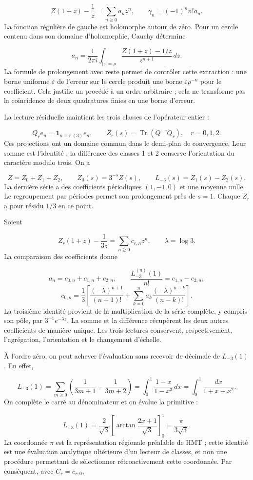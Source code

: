 \[
Z(1+z)-\frac1z=\sum_{n\geq0}a_nz^n,
\qquad \gamma_n=(-1)^nn!a_n.
\]
La fonction régulière de gauche est holomorphe autour de zéro. Pour un cercle contenu dans son domaine d’holomorphie, Cauchy détermine

\[
a_n=\frac1{2\pi i}\int_{|z|=\rho}
\frac{Z(1+z)-1/z}{z^{n+1}}\,dz.
\]
La formule de prolongement avec reste permet de contrôler cette extraction : une borne uniforme \(\varepsilon\) de l’erreur sur le cercle produit une borne \(\varepsilon\rho^{-n}\) pour le coefficient. Cela justifie un procédé à un ordre arbitraire ; cela ne transforme pas la coïncidence de deux quadratures finies en une borne d’erreur.

La lecture résiduelle maintient les trois classes de l'opérateur entier :

\[
Q_re_n=\mathbf1_{n\equiv r\ (3)}e_n,\qquad
Z_r(s)=\operatorname{Tr}(Q^{-s}Q_r),\quad r=0,1,2.
\]
Ces projections ont un domaine commun dans le demi-plan de convergence. Leur somme est l'identité ; la différence des classes 1 et 2 conserve l'orientation du caractère modulo trois. On a

\[
Z=Z_0+Z_1+Z_2,\qquad Z_0(s)=3^{-s}Z(s),\qquad
L_{-3}(s)=Z_1(s)-Z_2(s).
\]
La dernière série a des coefficients périodiques \((1,-1,0)\) et une moyenne nulle. Le regroupement par périodes permet son prolongement près de \(s=1\). Chaque \(Z_r\) a pour résidu \(1/3\) en ce point.

Soient

\[
Z_r(1+z)-\frac1{3z}=\sum_{n\geq0}c_{r,n}z^n,
\qquad \lambda=\log3.
\]
La comparaison des coefficients donne

\[
a_n=c_{0,n}+c_{1,n}+c_{2,n},\qquad
\frac{L_{-3}^{(n)}(1)}{n!}=c_{1,n}-c_{2,n},
\]
\[
c_{0,n}=\frac13\left[
\frac{(-\lambda)^{n+1}}{(n+1)!}
+\sum_{k=0}^na_k\frac{(-\lambda)^{n-k}}{(n-k)!}\right].
\]
La troisième identité provient de la multiplication de la série complète, y compris son pôle, par \(3^{-1}e^{-\lambda z}\). La somme et la différence récupèrent les deux autres coefficients de manière unique. Les trois lectures conservent, respectivement, l'agrégation, l'orientation et le changement d'échelle.

À l’ordre zéro, on peut achever l’évaluation sans recevoir de décimale de \(L_{-3}(1)\). En effet,

\[
L_{-3}(1)=\sum_{m\geq0}\left(\frac1{3m+1}-\frac1{3m+2}\right)
=\int_0^1\frac{1-x}{1-x^3}\,dx
=\int_0^1\frac{dx}{1+x+x^2}.
\]
On complète le carré au dénominateur et on évalue la primitive :

\[
L_{-3}(1)=\frac2{\sqrt3}
\left[\arctan\frac{2x+1}{\sqrt3}\right]_0^1
=\frac{\pi}{3\sqrt3}.
\]
La coordonnée \(\pi\) est la représentation régionale préalable de HMT ; cette identité est une évaluation analytique ultérieure d'un lecteur de classes, et non une procédure permettant de sélectionner rétroactivement cette coordonnée. Par conséquent, avec \(C_r=c_{r,0}\),

